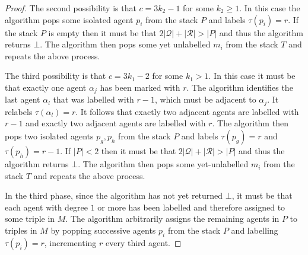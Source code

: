 \begin{proof}
The second possibility is that $c=3{k_2}-1$ for some ${k_2}\geq 1$. In this case the algorithm pops some isolated agent $p_i$ from the stack $P$ and labels $\tau(p_i)=r$. If the stack $P$ is empty then it must be that $2|\mathcal{Q}| + |\mathcal{R}| > |P|$ and thus the algorithm returns $\bot$. The algorithm then pops some yet unlabelled $m_i$ from the stack $T$ and repeats the above process.

The third possibility is that $c=3{k_1}-2$ for some ${k_1}>1$. In this case it must be that exactly one agent $\alpha_j$ has been marked with $r$. The algorithm identifies the last agent $\alpha_l$ that was labelled with $r-1$, which must be adjacent to $\alpha_j$. It relabels $\tau(\alpha_l)=r$. It follows that exactly two adjacent agents are labelled with $r-1$ and exactly two adjacent agents are labelled with $r$. The algorithm then pops two isolated agents $p_g, p_h$ from the stack $P$ and labels $\tau(p_g)=r$ and $\tau(p_h)=r-1$. If $|P|<2$ then it must be that $2|\mathcal{Q}| + |\mathcal{R}|>|P|$ and thus the algorithm returns $\bot$. The algorithm then pops some yet-unlabelled $m_i$ from the stack $T$ and repeats the above process.

In the third phase, since the algorithm has not yet returned $\bot$, it must be that each agent with degree $1$ or more has been labelled and therefore assigned to some triple in $M$. The algorithm arbitrarily assigns the remaining agents in $P$ to triples in $M$ by popping successive agents $p_i$ from the stack $P$ and labelling $\tau(p_i)=r$, incrementing $r$ every third agent.
\end{proof}
